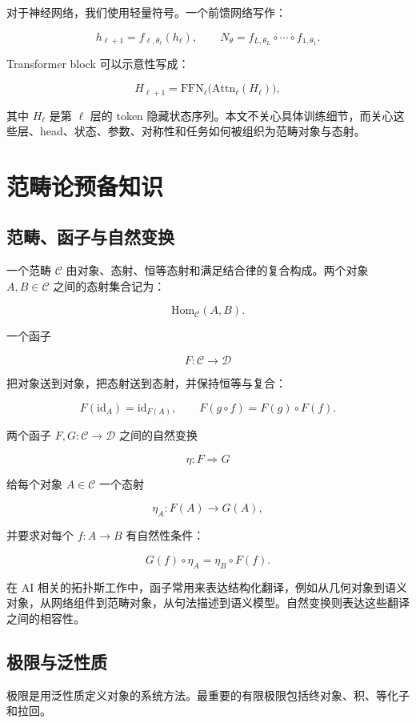 \documentclass[UTF8,11pt,fontset=none]{ctexart}
\begin{document}
对于神经网络，我们使用轻量符号。一个前馈网络写作：


\[
h_{\ell+1}=f_{\ell,\theta_\ell}(h_\ell),
\qquad
N_\theta=f_{L,\theta_L}\circ\cdots\circ f_{1,\theta_1}.
\]

Transformer block 可以示意性写成：


\[
H_{\ell+1}
=\mathrm{FFN}_\ell\bigl(\mathrm{Attn}_\ell(H_\ell)\bigr),
\]

其中 \(H_\ell\) 是第 \(\ell\) 层的 token 隐藏状态序列。本文不关心具体训练细节，而关心这些层、head、状态、参数、对称性和任务如何被组织为范畴对象与态射。


\section{范畴论预备知识}

\subsection{范畴、函子与自然变换}

一个范畴 \(\mathcal{C}\) 由对象、态射、恒等态射和满足结合律的复合构成。两个对象 \(A,B\in\mathcal{C}\) 之间的态射集合记为：


\[
\mathrm{Hom}_{\mathcal{C}}(A,B).
\]

一个函子


\[
F:\mathcal{C}\to\mathcal{D}
\]

把对象送到对象，把态射送到态射，并保持恒等与复合：


\[
F(\mathrm{id}_A)=\mathrm{id}_{F(A)},\qquad
F(g\circ f)=F(g)\circ F(f).
\]

两个函子 \(F,G:\mathcal{C}\to\mathcal{D}\) 之间的自然变换


\[
\eta:F\Rightarrow G
\]

给每个对象 \(A\in\mathcal{C}\) 一个态射


\[
\eta_A:F(A)\to G(A),
\]

并要求对每个 \(f:A\to B\) 有自然性条件：


\[
G(f)\circ \eta_A=\eta_B\circ F(f).
\]

在 AI 相关的拓扑斯工作中，函子常用来表达结构化翻译，例如从几何对象到语义对象，从网络组件到范畴对象，从句法描述到语义模型。自然变换则表达这些翻译之间的相容性。


\subsection{极限与泛性质}

极限是用泛性质定义对象的系统方法。最重要的有限极限包括终对象、积、等化子和拉回。
\end{document}
